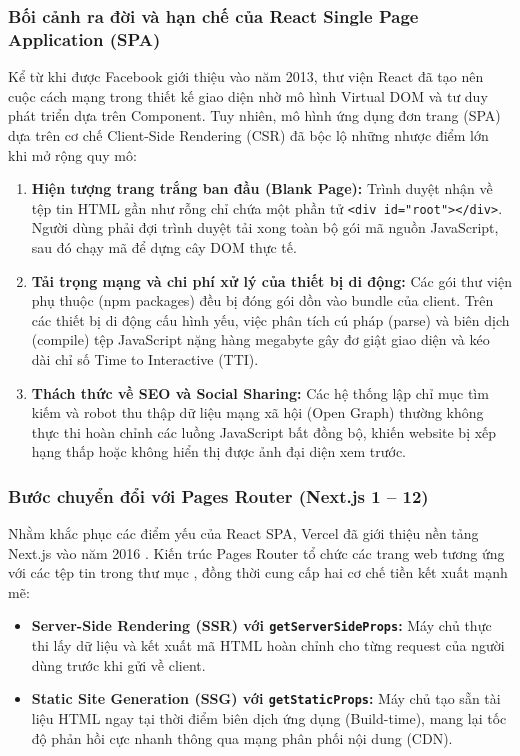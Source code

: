 \documentclass[12pt,a4paper]{extarticle}
\begin{document}
\subsubsection{Bối cảnh ra đời và hạn chế của React Single Page Application (SPA)}
Kể từ khi được Facebook giới thiệu vào năm 2013, thư viện React đã tạo nên cuộc cách mạng trong thiết kế giao diện nhờ mô hình Virtual DOM và tư duy phát triển dựa trên Component. Tuy nhiên, mô hình ứng dụng đơn trang (SPA) dựa trên cơ chế Client-Side Rendering (CSR) đã bộc lộ những nhược điểm lớn khi mở rộng quy mô:
\begin{enumerate}[noitemsep]
    \item \textbf{Hiện tượng trang trắng ban đầu (Blank Page):} Trình duyệt nhận về tệp tin HTML gần như rỗng chỉ chứa một phần tử \texttt{<div id="root"></div>}. Người dùng phải đợi trình duyệt tải xong toàn bộ gói mã nguồn JavaScript, sau đó chạy mã để dựng cây DOM thực tế.
    \item \textbf{Tải trọng mạng và chi phí xử lý của thiết bị di động:} Các gói thư viện phụ thuộc (npm packages) đều bị đóng gói dồn vào bundle của client. Trên các thiết bị di động cấu hình yếu, việc phân tích cú pháp (parse) và biên dịch (compile) tệp JavaScript nặng hàng megabyte gây đơ giật giao diện và kéo dài chỉ số Time to Interactive (TTI).
    \item \textbf{Thách thức về SEO và Social Sharing:} Các hệ thống lập chỉ mục tìm kiếm và robot thu thập dữ liệu mạng xã hội (Open Graph) thường không thực thi hoàn chỉnh các luồng JavaScript bất đồng bộ, khiến website bị xếp hạng thấp hoặc không hiển thị được ảnh đại diện xem trước.
\end{enumerate}

\subsubsection{Bước chuyển đổi với Pages Router (Next.js 1 -- 12)}
Nhằm khắc phục các điểm yếu của React SPA, Vercel đã giới thiệu nền tảng Next.js vào năm 2016 \cite{nextjs_docs}. Kiến trúc Pages Router tổ chức các trang web tương ứng với các tệp tin trong thư mục , đồng thời cung cấp hai cơ chế tiền kết xuất mạnh mẽ:
\begin{itemize}[noitemsep]
    \item \textbf{Server-Side Rendering (SSR) với \texttt{getServerSideProps}:} Máy chủ thực thi lấy dữ liệu và kết xuất mã HTML hoàn chỉnh cho từng request của người dùng trước khi gửi về client.
    \item \textbf{Static Site Generation (SSG) với \texttt{getStaticProps}:} Máy chủ tạo sẵn tài liệu HTML ngay tại thời điểm biên dịch ứng dụng (Build-time), mang lại tốc độ phản hồi cực nhanh thông qua mạng phân phối nội dung (CDN).
\end{itemize}
\end{document}
